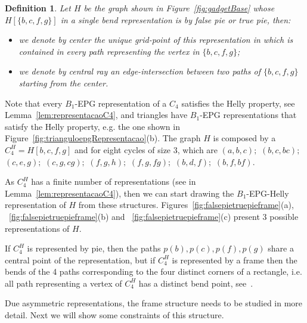 \documentclass[9pt]{entcs}
\newtheorem{defi}{Definition}[section]
\begin{document}

\begin{defi}
Let $H$ be the graph shown in Figure~\ref{fig:gadgetBase} whose $H[\{b, c, f, g \}]$ in a single bend representation is by false pie or true pie, then:

\begin{itemize}
\item we denote by \emph{center} the unique grid-point of this representation in which is contained in every path representing the vertex in $ \{b, c, f, g \}$; \label{lab:lab1}

\item we denote by \emph {central ray} an edge-intersection  between two paths of $ \{b, c, f, g \} $ starting from the center.
\end{itemize}
\end{defi}


Note that every $B_1$-EPG representation of a $C_4$ satisfies the Helly property, see Lemma~\ref{lem:representacaoC4}, and triangles have $B_1$-EPG representations that satisfy the Helly property, e.g. the one shown in Figure~\ref{fig:trianguloepgRepresentacao}(b). The graph $H$ is composed by a $C_4^{H}=H[b, c, f, g]$ and for eight cycles of size 3, which are $(a,b,c);$ $(b,c,bc);$ $(c,e,g);$ $(c,g,cg);$ $(f,g,h);$ $(f,g,fg);$ $(b,d,f);$ $(b,f,bf).$

As $C_4^{H}$ has a finite number of representations (see in Lemma~\ref{lem:representacaoC4}), then we can start drawing the $B_{1}$-EPG-Helly representation of $H$ from these structures.  Figures~\ref{fig:falsepietruepieframe}(a), ~\ref{fig:falsepietruepieframe}(b) and ~\ref{fig:falsepietruepieframe}(c) present 3 possible representations of $H$.


If $C_4^{H}$ is represented by pie, then the paths $p(b), p(c), p(f), p(g)$ share a central point of the representation, but if $C_4^{H}$ is represented by a frame then the bends of the 4 paths corresponding to the four distinct corners of a rectangle, i.e. all path representing a vertex of $C_4^{H}$ has a distinct bend point, see~\cite{golumbic2009}.

Due asymmetric representations, the frame structure needs to be studied in more detail. Next we will show some constraints of this structure. %
\end{document}
